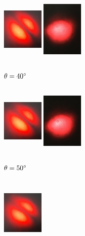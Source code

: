 \documentclass[12pt]{book}
\begin{document}
\begin{figure}[H]
\begin{subfigure}[b]{0.3\linewidth}
\centering
\includegraphics[width=2cm,height=3.5cm]{images/fotos/61.jpg}
\includegraphics[width=2cm,height=3.5cm]{images/fotos/62.jpg}
\caption{$\theta=40\degree$}
\end{subfigure}
\begin{subfigure}[b]{0.3\linewidth}
\centering
\includegraphics[width=2cm,height=3.5cm]{images/fotos/71.jpg}
\includegraphics[width=2cm,height=3.5cm]{images/fotos/52.jpg}
\caption{$\theta=50\degree$}
\end{subfigure}
\begin{subfigure}[b]{0.3\linewidth}
\centering
\includegraphics[width=2cm,height=3.5cm]{images/fotos/81.jpg}

\end{subfigure}
\end{figure}
\end{document}
